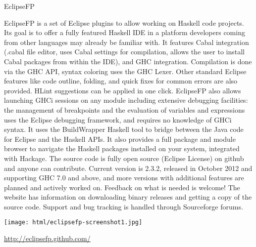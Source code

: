 \begin{hcarentry}[updated]{EclipseFP}
\makeheader

EclipseFP is a set of Eclipse plugins to allow working on Haskell code projects. Its goal is to offer a fully featured Haskell IDE in a platform developers coming from other languages may already be familiar with.
It features Cabal integration (.cabal file editor, uses Cabal settings for compilation, allows the user to install Cabal packages from within the IDE), and GHC integration. Compilation is done via the GHC API, syntax coloring uses the GHC Lexer. Other standard Eclipse features like code outline, folding, and quick fixes for common errors are also provided. HLint suggestions can be applied in one click. EclipseFP also allows launching GHCi sessions on any module including extensive debugging facilities: the management of breakpoints and the evaluation of variables and expressions uses the Eclipse debugging framework, and requires no knowledge of GHCi syntax. It uses the BuildWrapper Haskell tool to bridge between the Java code for Eclipse and the Haskell APIs. It also provides a full package and module browser to navigate the Haskell packages installed on your system, integrated with Hackage.
The source code is fully open source (Eclipse License) on github and anyone can contribute. Current version is 2.3.2, released in October 2012 and supporting GHC 7.0 and above, and more versions with additional features are planned and actively worked on. Feedback on what is needed is welcome! The website has information on downloading binary releases and getting a copy of the source code. Support and bug tracking is handled through Sourceforge forums.

\begin{center}
\texttt{[image: html/eclipsefp-screenshot1.jpg]}
\end{center}

\FurtherReading 
\url{http://eclipsefp.github.com/}
\end{hcarentry}
